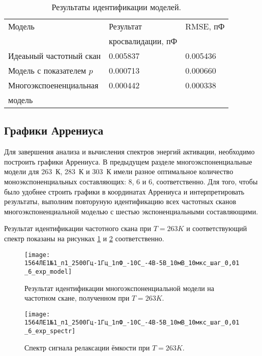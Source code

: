 	\begin{table}[!htp]
	\centering
	\caption{Результаты идентификации моделей.}
	\begin{tabular}{|l|l|l|}
		\hline
		Модель                    & Результат         & RMSE, пФ \\ 
		                          & кросвалидации, пФ &          \\ \hline
		Идеаьный частотный скан   & 0.005837          & 0.005436 \\ \hline
		Модель с показателем $p$  & 0.000713          & 0.000660 \\ \hline
		Многоэкспоененциальная    & 0.000442          & 0.000338 \\
		модель                    &                   &          \\ \hline
	\end{tabular}
	\label{table:model_comparison_303}
	\end{table}


	\newpage
	\subsection{Графики Аррениуса}
	Для завершения анализа и вычисления спектров энергий активации, необходимо
	построить графики Аррениуса. В предыдущем разделе многоэкспоненциальные
	модели для 263~К, 283~К и 303~К имели разное оптимальное количество 
	моноэкспоненциальных составляющих: 8, 6 и 6, соответственно. Для того, чтобы
	было удобнее строить графики в координатах Аррениуса и интерпретировать 
	результаты, выполним повторуную идентификацию всех частотных сканов 
	многоэкспоненциальной моделью с шестью экспоненциальными составляющими.

	Результат идентификации частотного скана при $T=263 K$ и соответствующий
	спектр показаны на рисунках \ref{pic:6_exp_model_263} и 
	\ref{pic:6_exp_spectr_263} соответственно.

	\begin{figure}[!htp]
		\centering
		\texttt{[image: 1564ЛЕ1№1\_п1\_2500Гц-1Гц\_1пФ\_-10С\_-4В-5В\_10мВ\_10мкс\_шаг\_0,01\_6\_exp\_model]}
		\caption{Результат идентификации многоэкспоненциальной модели на 
		частотном скане, полученном при $T=263 K$.}
		\label{pic:6_exp_model_263}
	\end{figure}

	\begin{figure}[!htp]
		\centering
		\texttt{[image: 1564ЛЕ1№1\_п1\_2500Гц-1Гц\_1пФ\_-10С\_-4В-5В\_10мВ\_10мкс\_шаг\_0,01\_6\_exp\_spectr]}
		\caption{Спектр сигнала релаксации ёмкости при $T=263 K$.}
		\label{pic:6_exp_spectr_263}
	\end{figure}



